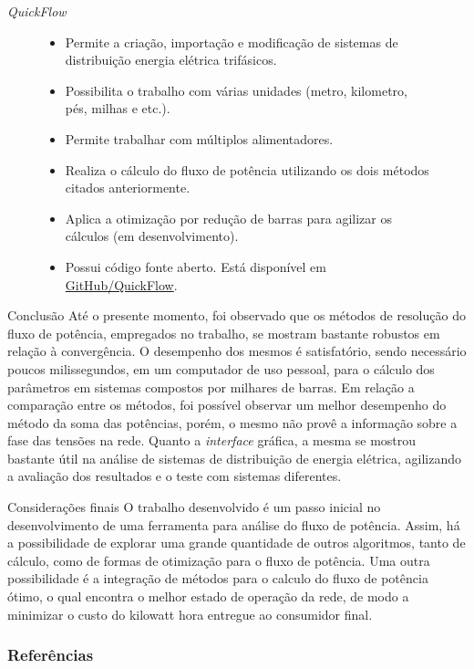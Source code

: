 \documentclass[10pt]{beamer}
\begin{document}
\begin{frame}{\textit{QuickFlow}}
    \begin{figure}[H]
        \begin{itemize}
            \item Permite a criação, importação e modificação de sistemas de distribuição energia elétrica trifásicos.
            
            \item Possibilita o trabalho com várias unidades (metro, kilometro, pés, milhas e etc.).
             
            \item Permite trabalhar com múltiplos alimentadores.
             
            \item Realiza o cálculo do fluxo de potência utilizando os dois métodos citados anteriormente.
            
            \item Aplica a otimização por redução de barras para agilizar os cálculos (em desenvolvimento).
            
            \item Possui código fonte aberto. Está disponível em \href{http://www.github.com/DKrepsky/QuickFlow}{GitHub/QuickFlow}.
            
        \end{itemize}
    \end{figure}
\end{frame}

\begin{frame}{Conclusão}
    Até o presente momento, foi observado que os métodos de resolução do fluxo de potência, empregados no trabalho, se mostram bastante robustos em relação à convergência. O desempenho dos mesmos é satisfatório, sendo necessário poucos milissegundos, em um computador de uso pessoal, para o cálculo dos parâmetros em sistemas compostos por milhares de barras. Em relação a comparação entre os métodos, foi possível observar um melhor desempenho do método da soma das potências, porém, o mesmo não provê a informação sobre a fase das tensões na rede.
    Quanto a \textit{interface} gráfica, a mesma se mostrou bastante útil na análise de sistemas de distribuição de energia elétrica, agilizando a avaliação dos resultados e o teste com sistemas diferentes.
\end{frame}

\begin{frame}{Considerações finais}
    O trabalho desenvolvido é um passo inicial no desenvolvimento de uma ferramenta para análise do fluxo de potência. Assim, há a possibilidade de explorar uma grande quantidade de outros algoritmos, tanto de cálculo, como de formas de otimização para o fluxo de potência.
    Uma outra possibilidade é a integração de métodos para o calculo do fluxo de potência ótimo, o qual encontra o melhor estado de operação da rede, de modo a minimizar o custo do kilowatt hora entregue ao consumidor final.
\end{frame}

\begin{frame}[allowframebreaks]

  \frametitle{Referências}

  
  

\end{frame}

\end{document}
